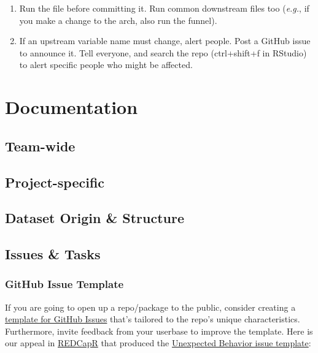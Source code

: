 \documentclass[
]{book}
\providecommand{\tightlist}{%
  \setlength{\itemsep}{0pt}\setlength{\parskip}{0pt}}
\begin{document}
\begin{enumerate}
\def\labelenumi{\arabic{enumi}.}
\tightlist
\item
  Run the file before committing it. Run common downstream files too (\emph{e.g.}, if you make a change to the arch, also run the funnel).
\item
  If an upstream variable name must change, alert people. Post a GitHub issue to announce it. Tell everyone, and search the repo (ctrl+shift+f in RStudio) to alert specific people who might be affected.
\end{enumerate}

\hypertarget{document}{%
\chapter{Documentation}\label{document}}

\hypertarget{team-wide}{%
\section{Team-wide}\label{team-wide}}

\hypertarget{project-specific}{%
\section{Project-specific}\label{project-specific}}

\hypertarget{dataset-origin-structure}{%
\section{Dataset Origin \& Structure}\label{dataset-origin-structure}}

\hypertarget{issues-tasks}{%
\section{Issues \& Tasks}\label{issues-tasks}}

\hypertarget{documentation-issue-template}{%
\subsection{GitHub Issue Template}\label{documentation-issue-template}}

If you are going to open up a repo/package to the public, consider creating a \href{https://help.github.com/en/github/building-a-strong-community/about-issue-and-pull-request-templates}{template for GitHub Issues} that's tailored to the repo's unique characteristics. Furthermore, invite feedback from your userbase to improve the template. Here is our appeal in \href{https://github.com/OuhscBbmc/REDCapR/issues/291}{REDCapR} that produced the \href{https://github.com/OuhscBbmc/REDCapR/blob/master/.github/ISSUE_TEMPLATE/unexpected-behavior-issue-template.md}{Unexpected Behavior issue template}:
\end{document}
